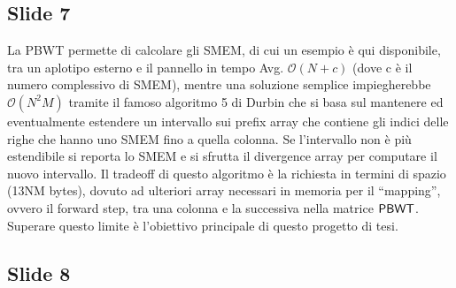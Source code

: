 \documentclass[a4paper,11pt, oneside,italian]{article}
\def\PBWT{\mbox{\rm {\sf PBWT}}}
\begin{document}
\subsection*{Slide 7}
La PBWT permette di calcolare gli SMEM, di cui un esempio è qui disponibile,
tra un aplotipo esterno e il pannello in tempo Avg. $\mathcal{O}(N + c)$ (dove c
è il numero complessivo di SMEM), mentre una soluzione semplice impiegherebbe
$\mathcal{O}(N^2M)$ tramite il famoso algoritmo 5 di Durbin che si basa sul
mantenere ed eventualmente estendere un intervallo sui prefix array che contiene
gli indici delle righe che hanno uno SMEM fino a quella colonna. Se l'intervallo
non è più estendibile si reporta lo SMEM e si sfrutta il divergence array per
computare il nuovo intervallo.
Il tradeoff di questo algoritmo è la richiesta in termini di spazio (13NM
bytes), dovuto ad ulteriori array necessari in memoria per il ``mapping'',
ovvero il forward step, tra una colonna e la successiva nella matrice
$\PBWT$. Superare questo limite è l’obiettivo principale di questo progetto di
tesi.
\subsection*{Slide 8}
\end{document}
